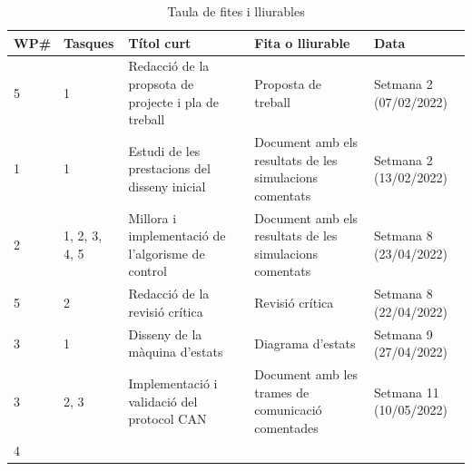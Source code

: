 {{        \begin{table}[!htb]
            \caption{ Taula de fites i lliurables }
            \centering
            \tablefirsthead{}
            \tablehead{}
            \tabletail{}
            \tablelasttail{}
            \renewcommand{\arraystretch}{1.3}

            \begin{supertabular}{|m{1.1cm}|m{1.8cm}|m{4.3cm}|m{4.3cm}|m{2.4cm}|}
                \hline
                    \textbf{ WP\# } & 
                    \textbf{ Tasques } & 
                    \textbf{ Títol curt } & 
                    \textbf{ Fita o lliurable } & 
                    \textbf{ Data } \\
                \hline
                    { 5 } & 
                    { 1 } & 
                    { Redacció de la propsota de projecte i pla de treball } & 
                    { Proposta de treball } & 
                    { Setmana 2 (07/02/2022) } \\
                \hline
                    { 1 } & 
                    { 1 } & 
                    { Estudi de les prestacions del disseny inicial } & 
                    { Document amb els resultats de les simulacions comentats } & 
                    { Setmana 2 (13/02/2022) } \\
                \hline
                    { 2 } & 
                    { 1, 2, 3, 4, 5 } & 
                    { Millora i implementació de l'algorisme de control } & 
                    { Document amb els resultats de les simulacions comentats } & 
                    { Setmana 8 (23/04/2022) } \\
                \hline
                    { 5 } &
                    { 2 } & 
                    { Redacció de la revisió crítica } & 
                    { Revisió crítica} & 
                    { Setmana 8 (22/04/2022) } \\
                \hline
                    { 3 } & 
                    { 1 } & 
                    { Disseny de la màquina d'estats } & 
                    { Diagrama d'estats } & 
                    { Setmana 9 (27/04/2022) } \\
                \hline
                    { 3 } & 
                    { 2, 3 } & 
                    { Implementació i validació del protocol CAN } & 
                    { Document amb les trames de comunicació comentades } & 
                    { Setmana 11 (10/05/2022) } \\
                \hline
                    { 4 } & 

\end{supertabular}
\end{table}}}
